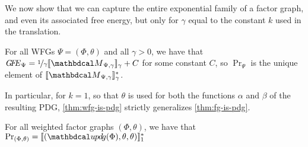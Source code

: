 \documentclass{article}
\begin{document}
	
	
	
	We now show that we can capture the entire exponential family of a factor graph,
	and even its associated free energy, 
	but only for $\gamma$ equal to the constant $k$ used in
	the translation.  
	
	
	\begin{theorem}\label{thm:wfg-is-pdg}
	For all WFGs $\Psi = (\Phi,\theta)$ and all $\gamma > 0$,
	we have that
	$\GFE_\Psi
	= \nicefrac1{\gamma} \bbr{{\dg M}_{\Psi,\gamma}}_{\gamma} 
	+ C$   
	for some constant $C$, so
	$\Pr_{\Psi}$ is the unique element of
	$\bbr{{\dg M}_{\Psi,\gamma}}_{\gamma}^*$.
	\end{theorem}
	
	In particular, for $k\!=\!1$, so that $\theta$ is used for both the functions
	$\alpha$ and $\beta$ of the resulting PDG,
	\cref{thm:wfg-is-pdg} strictly generalizes \cref{thm:fg-is-pdg}.
	\begin{coro}
		For all weighted factor graphs $(\Phi, \theta)$,
		we have that
		$\Pr_{(\Phi,\theta)} = \bbr{(\UPDGof{\Phi}, \theta,\theta)}_1^*$
	\end{coro}
	
\end{document}
